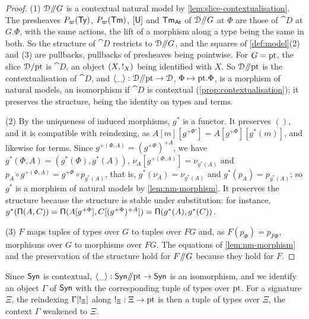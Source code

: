 \begin{proof}
    (1) $\mathcal{D}\mathord{/\mkern-5mu/} G$ is a contextual natural model by \cref{lem:slice-contextualisation}. The presheaves $P_\varpi(\mathsf{Ty})$, $P_\varpi(\mathsf{Tm})$, $[\mathsf{U}]$ and $\mathsf{Tm}_{\mathsf{At}}$ of $\mathcal{D}\mathord{/\mkern-5mu/} G$ at $\Phi$ are those of $\cat{D}$ at $G.\Phi$, with the same actions, the lift of a morphism along a type being the same in both. So the structure of $\cat{D}$ restricts to $\mathcal{D}\mathord{/\mkern-5mu/} G$, and the squares of \cref{def:model}(2) and (3) are pullbacks, pullbacks of presheaves being pointwise. For $G = \mathrm{pt}$, the slice $\mathcal{D}/\mathrm{pt}$ is $\cat{D}$, an object $(X, {!}_X)$ being identified with $X$. So $\mathcal{D}\mathord{/\mkern-5mu/} \mathrm{pt}$ is the contextualisation of $\cat{D}$, and $\langle \_ \rangle : \mathcal{D}\mathord{/\mkern-5mu/} \mathrm{pt} \to \mathcal{D}$, $\Phi \mapsto \mathrm{pt}.\Phi$, is a morphism of natural models, an isomorphism if $\cat{D}$ is contextual (\cref{prop:contextualisation}); it preserves the structure, being the identity on types and terms.

    (2) By the uniqueness of induced morphisms, $g^*$ is a functor. It preserves $()$, and it is compatible with reindexing, as $A[m][g^{+\Phi'}] = A[g^{+\Phi}][g^*(m)]$, and likewise for terms. Since $g^{+(\Phi, A)} = (g^{+\Phi})^{+A}$, we have $g^*(\Phi, A) = (g^*(\Phi), g^*(A))$, $\nu_A[g^{+(\Phi, A)}] = \nu_{g^*(A)}$ and $p_A \circ g^{+(\Phi, A)} = g^{+\Phi} \circ p_{g^*(A)}$, that is, $g^*(\nu_A) = \nu_{g^*(A)}$ and $g^*(p_A) = p_{g^*(A)}$; so $g^*$ is a morphism of natural models by \cref{lem:nm-morphism}. It preserves the structure because the structure is stable under substitution: for instance, $g^*(\mathsf{\Pi}(A, C)) = \mathsf{\Pi}(A[g^{+\Phi}], C[(g^{+\Phi})^{+A}]) = \mathsf{\Pi}(g^*(A), g^*(C))$.

    (3) $F$ maps tuples of types over $G$ to tuples over $FG$ and, as $F(p_\Phi) = p_{F\Phi}$, morphisms over $G$ to morphisms over $FG$. The equations of \cref{lem:nm-morphism} and the preservation of the structure hold for $F\mathord{/\mkern-5mu/} G$ because they hold for $F$.
\end{proof}

Since $\mathsf{Syn}$ is contextual, $\langle \_ \rangle : \mathsf{Syn}\mathord{/\mkern-5mu/} \mathrm{pt} \to \mathsf{Syn}$ is an isomorphism, and we identify an object $\Gamma$ of $\mathsf{Syn}$ with the corresponding tuple of types over $\mathrm{pt}$. For a signature $\Xi$, the reindexing $\Gamma[{!}_\Xi]$ along ${!}_\Xi : \Xi \to \mathrm{pt}$ is then a tuple of types over $\Xi$, the context $\Gamma$ weakened to $\Xi$.

